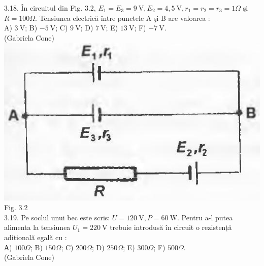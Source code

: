 \documentclass[10pt]{article}
\begin{document}
3.18. În circuitul din Fig. 3.2, $E_{1}=E_{3}=9 \mathrm{~V}, E_{2}=4,5 \mathrm{~V}, r_{1}=r_{2}=r_{3}=1 \Omega$ şi $R=100 \Omega$. Tensiunea electrică între punctele A şi B are valoarea :\\ A) $3 \mathrm{~V}$; B) $-5 \mathrm{~V}$; C) $9 \mathrm{~V}$; D) $7 \mathrm{~V}$; E) $13 \mathrm{~V}$; F) $-7 \mathrm{~V}$.\\ (Gabriela Cone)\\ \includegraphics[max width=\textwidth, center]{2025_07_01_5b3ff9fa0d508c8e9f17g-147(1)} Fig. 3.2\\

3.19. Pe soclul unui bec este scris: $U=120 \mathrm{~V}, P=60 \mathrm{~W}$. Pentru a-l putea alimenta la tensiunea $U_{1}=220 \mathrm{~V}$ trebuie introdusă în circuit o rezistență adițională egală cu :\\ А) $100 \Omega$; B) $150 \Omega$; C) $200 \Omega$; D) $250 \Omega$; E) $300 \Omega$; F) $500 \Omega$.\\ (Gabriela Cone)\\
\end{document}
